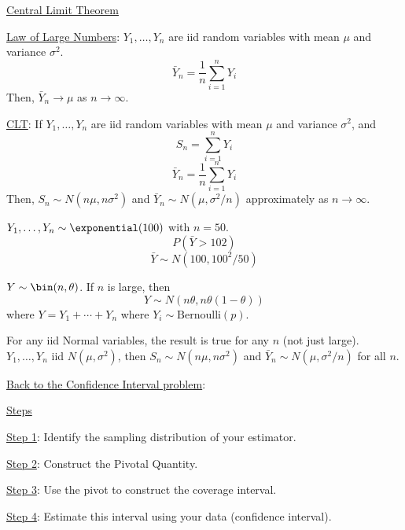 \underline{Central Limit Theorem}

\underline{Law of Large Numbers}: $ Y_1,\ldots ,Y_n $ are iid random
variables with mean $ \mu $ and variance $ \sigma^2 $.
\[ \bar{Y}_n=\frac{1}{n} \sum\limits_{i=1}^{n} Y_i \]
Then, $ \bar{Y}_n\to \mu $ as $ n\to \infty $.

\underline{CLT}: If $ Y_1,\ldots ,Y_n $ are iid random variables
with mean $ \mu $ and variance $ \sigma^2 $, and
\[ S_n=\sum\limits_{i=1}^{n} Y_i \]
\[ \bar{Y}_n=\frac{1}{n} \sum\limits_{i=1}^{n} Y_i \]
Then, $ S_n \sim N(n\mu,n\sigma^2) $ and $ \bar{Y}_n
    \sim N(\mu,\sigma^2/n) $ approximately as $ n\to \infty $.

\begin{Example}{}{}
    $ Y_1,\ldots ,Y_n \sim \exponential(100) $ with $ n=50 $.
    \[ P\left(\bar{Y}>102\right) \]
    \[ \bar{Y} \sim N(100,100^2/50) \]
\end{Example}


\begin{Example}{}{}
    $ Y \sim \bin(n,\theta) $. If $ n $ is large, then
    \[ Y \sim N(n\theta,n\theta(1-\theta)) \]
    where $ Y=Y_1+\cdots+Y_n $ where $ Y_i \sim \text{Bernoulli}(p) $.
\end{Example}


\begin{Example}{}{}
    For any iid Normal variables, the result is true for any $ n $ (not just large).
    $ Y_1,\ldots ,Y_n $ iid $ N(\mu,\sigma^2) $, then $ S_n \sim N(n\mu,n\sigma^2) $
    and $ \bar{Y}_n \sim N(\mu,\sigma^2/n) $ for all $ n $.
\end{Example}

\underline{Back to the Confidence Interval problem}:

\underline{Steps}

\underline{Step 1}: Identify the sampling distribution of your estimator.

\underline{Step 2}: Construct the Pivotal Quantity.

\underline{Step 3}: Use the pivot to construct the coverage interval.

\underline{Step 4}: Estimate this interval using your data (confidence interval).



